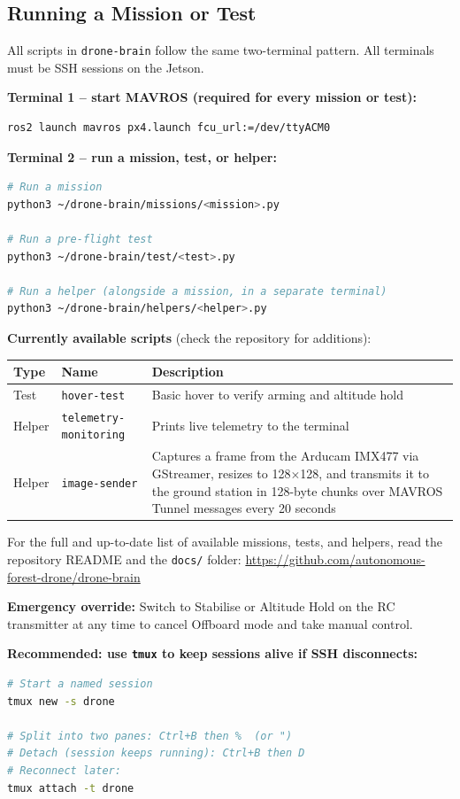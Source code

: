 \documentclass{article}
\begin{document}
\subsection{Running a Mission or Test}

All scripts in \texttt{drone-brain} follow the same two-terminal pattern. All terminals must be SSH sessions on the Jetson.

\textbf{Terminal 1 -- start MAVROS (required for every mission or test):}
\begin{lstlisting}[language=bash]
ros2 launch mavros px4.launch fcu_url:=/dev/ttyACM0
\end{lstlisting}

\textbf{Terminal 2 -- run a mission, test, or helper:}
\begin{lstlisting}[language=bash]
# Run a mission
python3 ~/drone-brain/missions/<mission>.py

# Run a pre-flight test
python3 ~/drone-brain/test/<test>.py

# Run a helper (alongside a mission, in a separate terminal)
python3 ~/drone-brain/helpers/<helper>.py
\end{lstlisting}

\textbf{Currently available scripts} (check the repository for additions):

\begin{tabular}{llp{10cm}}
\toprule
\textbf{Type} & \textbf{Name} & \textbf{Description} \\
\midrule
Test & \texttt{hover-test} & Basic hover to verify arming and altitude hold \\
Helper & \texttt{telemetry-monitoring} & Prints live telemetry to the terminal \\
Helper & \texttt{image-sender} & Captures a frame from the Arducam IMX477 via GStreamer, resizes to 128$\times$128, and transmits it to the ground station in 128-byte chunks over MAVROS Tunnel messages every 20 seconds \\
\bottomrule
\end{tabular}

For the full and up-to-date list of available missions, tests, and helpers, read the repository README and the \texttt{docs/} folder: \url{https://github.com/autonomous-forest-drone/drone-brain}

\textbf{Emergency override:} Switch to Stabilise or Altitude Hold on the RC transmitter at any time to cancel Offboard mode and take manual control.

\textbf{Recommended: use \texttt{tmux} to keep sessions alive if SSH disconnects:}
\begin{lstlisting}[language=bash]
# Start a named session
tmux new -s drone

# Split into two panes: Ctrl+B then %  (or ")
# Detach (session keeps running): Ctrl+B then D
# Reconnect later:
tmux attach -t drone
\end{lstlisting}
\end{document}
